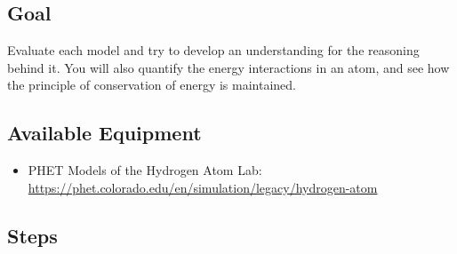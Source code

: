 \subsection{Goal} 
 Evaluate each model and try to develop an understanding for the reasoning behind it. You will also quantify the energy interactions in an atom, and see how the principle of conservation of energy is maintained. 

\subsection{Available Equipment}

\begin{itemize}
	\item PHET Models of the Hydrogen Atom Lab: \url{https://phet.colorado.edu/en/simulation/legacy/hydrogen-atom}
\end{itemize}

\subsection{Steps}

